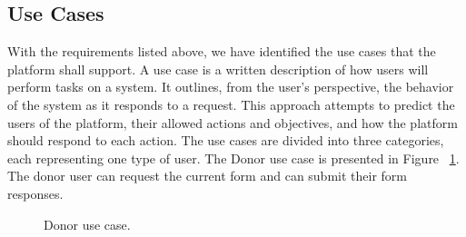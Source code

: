 \subsection{Use Cases}\label{sec:use_cases}
With the requirements listed above, we have identified the use cases that the platform
shall support. A use case is a written description of how users will perform tasks on
a system. It outlines, from the user's perspective, the behavior of the system as it
responds to a request. This approach attempts to predict the users of the platform, their allowed actions and objectives, and how the platform should respond to each action.
The use cases are divided into three categories, each representing one type of user.
The Donor use case is presented in Figure ~\ref{fig:donor_use_case}. The donor user can request the current form and can submit their form responses.

\begin{figure}[H]
	\begin{center}
	\end{center}
	\caption{Donor use case.}\label{fig:donor_use_case}
\end{figure}

